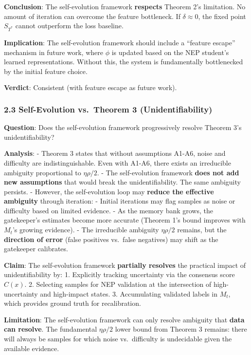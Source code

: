 \documentclass[
  12pt,
]{article}
\begin{document}
\textbf{Conclusion}: The self-evolution framework \textbf{respects}
Theorem 2's limitation. No amount of iteration can overcome the feature
bottleneck. If \(\delta \approx 0\), the fixed point \(S_{T^*}\) cannot
outperform the loss baseline.

\textbf{Implication}: The self-evolution framework should include a
``feature escape'' mechanism in future work, where \(\phi\) is updated
based on the NEP student's learned representations. Without this, the
system is fundamentally bottlenecked by the initial feature choice.

\textbf{Verdict}: Consistent (with feature escape as future work).

\subsubsection{2.3 Self-Evolution vs.~Theorem 3
(Unidentifiability)}\label{self-evolution-vs.-theorem-3-unidentifiability}

\textbf{Question}: Does the self-evolution framework progressively
resolve Theorem 3's unidentifiability?

\textbf{Analysis}: - Theorem 3 states that without assumptions A1-A6,
noise and difficulty are indistinguishable. Even with A1-A6, there
exists an irreducible ambiguity proportional to \(\eta\rho/2\). - The
self-evolution framework \textbf{does not add new assumptions} that
would break the unidentifiability. The same ambiguity persists. -
However, the self-evolution loop may \textbf{reduce the effective
ambiguity} through iteration: - Initial iterations may flag samples as
noise or difficulty based on limited evidence. - As the memory bank
grows, the gatekeeper's estimates become more accurate (Theorem 1's
bound improves with \(M_t\)'s growing evidence). - The irreducible
ambiguity \(\eta\rho/2\) remains, but the \textbf{direction of error}
(false positives vs.~false negatives) may shift as the gatekeeper
calibrates.

\textbf{Claim}: The self-evolution framework \textbf{partially resolves}
the practical impact of unidentifiability by: 1. Explicitly tracking
uncertainty via the consensus score \(C(x)\). 2. Selecting samples for
NEP validation at the intersection of high-uncertainty and high-impact
states. 3. Accumulating validated labels in \(M_t\), which provides
ground truth for recalibration.

\textbf{Limitation}: The self-evolution framework can only resolve
ambiguity that \textbf{data can resolve}. The fundamental \(\eta\rho/2\)
lower bound from Theorem 3 remains: there will always be samples for
which noise vs.~difficulty is undecidable given the available evidence.
\end{document}
